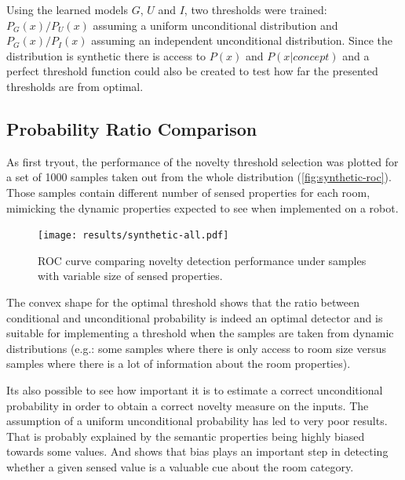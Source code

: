 \documentclass[runningheads,a4paper]{llncs}
\begin{document}
Using the learned models $G$, $U$ and $I$, two thresholds were trained:
$P_G(x)/P_U(x)$ assuming a uniform unconditional distribution
and $P_G(x)/P_I(x)$ assuming an independent unconditional distribution.
Since the distribution is synthetic there is access to $P(x)$ and $P(x|concept)$
and a perfect threshold function could also be created to test how far the
presented thresholds are from optimal.

\subsection{Probability Ratio Comparison}
As first tryout, the performance of the novelty threshold selection was plotted for a set
of 1000 samples taken out from the whole distribution (\autoref{fig:synthetic-roc}).
Those samples contain different number of sensed properties for each room, mimicking
the dynamic properties expected to see when implemented on a robot.

\begin{figure}[h]
\centering
\texttt{[image: results/synthetic-all.pdf]}

\caption{\label{fig:synthetic-roc}ROC curve comparing novelty detection performance
         under samples with variable size of sensed properties.}
\end{figure}

The convex shape for the optimal threshold shows that the ratio between conditional
and unconditional probability is indeed an optimal detector and is suitable for
implementing a threshold when the samples are taken from dynamic
distributions (e.g.: some samples where there is only access to room size versus
samples where there is a lot of information about the room properties).

Its also possible to see how important it is to estimate a correct unconditional
probability in order to obtain a correct novelty measure on the inputs.
The assumption of a uniform unconditional probability has led to very poor results.
That is probably explained by the semantic properties being highly
biased towards some values. And shows that bias plays an important step
in detecting whether a given sensed value is a valuable cue about the room category.
\end{document}
